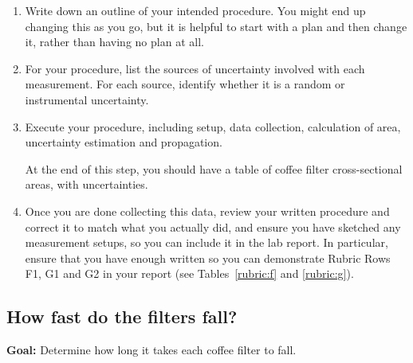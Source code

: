 \begin{enumerate}
	\item Write down an outline of your intended procedure. You might end up changing this as you go, but it is helpful to start with a plan and then change it, rather than having no plan at all.
	
	\item For your procedure, list the sources of uncertainty involved with each measurement. For each source, identify whether it is a random or instrumental uncertainty.
	
	\item Execute your procedure, including setup, data collection, calculation of area, uncertainty estimation and propagation.
	
	\begin{framed}
	At the end of this step, you should have a table of coffee filter cross-sectional areas, with uncertainties.
	\end{framed}
	
	\item Once you are done collecting this data, review your written procedure and correct it to match what you actually did, and ensure you have sketched any measurement setups, so you can include it in the lab report. In particular, ensure that you have enough written so you can demonstrate Rubric Rows F1, G1 and G2 in your report (see Tables~\ref{rubric:f} and \ref{rubric:g}).
	
\end{enumerate}
 
\subsection{How fast do the filters fall?}

\textbf{Goal:} Determine how long it takes each coffee filter to fall.

